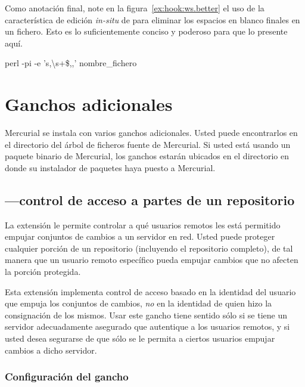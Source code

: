 Como anotación final, note en la figura~\ref{ex:hook:ws.better} el
uso de la característica de edición \emph{in-situ} de 
para eliminar los espacios en blanco finales en un fichero. Esto es
lo suficientemente conciso y poderoso para que lo presente aquí.
\begin{codesample2}
    perl -pi -e 's,\textbackslash{}s+\$,,' nombre\_fichero
\end{codesample2}

\section{Ganchos adicionales}

Mercurial se instala con varios ganchos adicionales. Usted puede
encontrarlos en el directorio  del árbol de ficheros
fuente de Mercurial. Si usted está usando un paquete binario de
Mercurial, los ganchos estarán ubicados en el directorio
 en donde su instalador de paquetes haya puesto a
Mercurial.

\subsection{---control de acceso a partes de un repositorio}

La extensión  le permite controlar a qué usuarios remotos
les está permitido empujar conjuntos de cambios a un servidor en red.
Usted puede proteger cualquier porción de un repositorio (incluyendo
el repositorio completo), de tal manera que un usuario remoto
específico pueda empujar cambios que no afecten la porción protegida.

Esta extensión implementa control de acceso basado en la identidad del
usuario que empuja los conjuntos de cambios, \emph{no} en la identidad
de quien hizo la consignación de los mismos. Usar este gancho tiene
sentido sólo si se tiene un servidor adecuadamente asegurado que
autentique a los usuarios remotos, y si usted desea segurarse de que
sólo se le permita a ciertos usuarios empujar cambios a dicho
servidor.

\subsubsection{Configuración del gancho }

